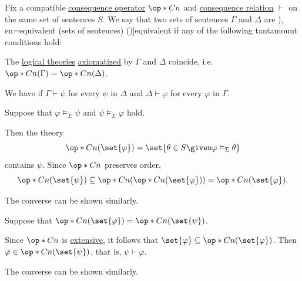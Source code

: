 \begin{definition}\label{def:logical_equivalence}\mimprovised
  Fix a compatible \hyperref[def:consequence_operator]{consequence operator} \( \op*{Cn} \) and \hyperref[def:consequence_relation]{consequence relation} \( {\vdash} \) on the same set of sentences \( S \). We say that two sets of sentences \( \Gamma \) and \( \Delta \) are \term[ru=равносильные / эквивалентные (формулы) (\cite[44]{КолмогоровДрагалин2006ЛогикаВведение}), en=equivalent (sets of sentences) (\cite[def. 2]{Tarski1983Collection:FundamentalConceptsOfMetamathematics})]{equivalent} if any of the following tantamount conditions hold:
  \begin{thmenum}[series=def:logical_equivalence]
     The \hyperref[def:logical_theory]{logical theories} \hyperref[def:logical_theory]{axiomatized} by \( \Gamma \) and \( \Delta \) coincide, i.e. \( \op*{Cn}(\Gamma) = \op*{Cn}(\Delta) \).

     We have if \( \Gamma \vdash \psi \) for every \( \psi \) in \( \Delta \) and \( \Delta \vdash \varphi \) for every \( \varphi \) in \( \Gamma \).
  \end{thmenum}
\end{definition}
\begin{defproof}
   Suppose that \( \varphi \vDash_\Sigma \psi \) and \( \psi \vDash_\Sigma \varphi \) hold.

  Then the theory
  \begin{equation*}
    \op*{Cn}(\set{ \varphi }) = \set{ \theta \in S \given \varphi \vDash_\Sigma \theta }
  \end{equation*}
  contains \( \psi \). Since \( \op*{Cn} \) preserves order,
  \begin{equation*}
    \op*{Cn}(\set{ \psi }) \subseteq \op*{Cn}(\op*{Cn}(\set{ \varphi })) = \op*{Cn}(\set{ \varphi }).
  \end{equation*}

  The converse can be shown similarly.

   Suppose that \( \op*{Cn}(\set{ \varphi }) = \op*{Cn}(\set{ \psi }) \).

  Since \( \op*{Cn} \) is \hyperref[def:extensive_function]{extensive}, it follows that \( \set{ \varphi } \subseteq \op*{Cn}(\set{ \varphi }) \). Then \( \varphi \in \op*{Cn}(\set{ \psi }) \), that is, \( \psi \vdash \varphi \).

  The converse can be shown similarly.
\end{defproof}

